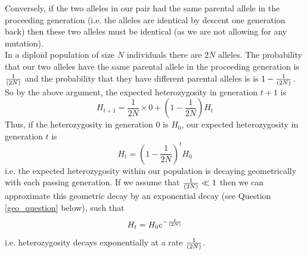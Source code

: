 Conversely, if the two alleles in our pair had the same parental allele in
the proceeding generation (i.e. the alleles are identical by descent
one generation back) then these two alleles must be identical (as we
are not allowing for any mutation). \\



In a diploid population of size $N$ individuals there are $2N$ alleles. The
probability that our two alleles have the same parental allele in the
proceeding generation is $\nicefrac{1}{(2N)}$ and the probability that they have
different parental alleles is is $1-\nicefrac{1}{(2N)}$. So by the above
argument, the expected heterozygosity in generation $t+1$ is
%
\begin{equation}
H_{t+1} = \frac{1}{2N} \times 0 + \left(1-\frac{1}{2N} \right)H_t
\end{equation}
%
Thus, if the heterozygosity in generation $0$ is $H_0$, our
expected heterozygosity in generation $t$ is
%
\begin{equation}
H_t = \left(1-\frac{1}{2N} \right)^tH_0  \label{eqn:loss_het_discrete}
\end{equation}
%
i.e. the expected heterozygosity within our population is decaying
geometrically with each passing generation. If we assume that $\nicefrac{1}{(2N)}
\ll 1$ then we can approximate this geometric decay by an exponential
decay (see Question \ref{geo_question} below), such that
%
\begin{equation}
H_t =H_{0} e^{ - \nicefrac{t}{(2N)} }
\end{equation}
%
i.e. heterozygosity decays exponentially at a rate
$\nicefrac{1}{(2N)}$.

